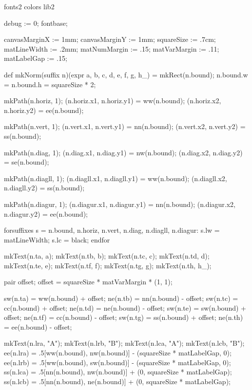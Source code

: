 \environment fonts2
\environment colors
\environment lib2


\startMPinitializations

debug := 0;
fontbase;

canvasMarginX := 1mm;
canvasMarginY := 1mm;
squareSize := .7cm;
matLineWidth := .2mm;
matNumMargin := .15;
matVarMargin := .11;
matLabelGap := .15;


def mkNorm(suffix n)(expr a, b, c, d, e, f, g, h_) =
  mkRect(n.bound);
  n.bound.w = n.bound.h = squareSize * 2;

  mkPath(n.horiz, 1);
  (n.horiz.x1, n.horiz.y1) = ww(n.bound);
  (n.horiz.x2, n.horiz.y2) = ee(n.bound);

  mkPath(n.vert, 1);
  (n.vert.x1, n.vert.y1) = nn(n.bound);
  (n.vert.x2, n.vert.y2) = ss(n.bound);

  mkPath(n.diag, 1);
  (n.diag.x1, n.diag.y1) = nw(n.bound);
  (n.diag.x2, n.diag.y2) = se(n.bound);

  mkPath(n.diagll, 1);
  (n.diagll.x1, n.diagll.y1) = ww(n.bound);
  (n.diagll.x2, n.diagll.y2) = ss(n.bound);

  mkPath(n.diagur, 1);
  (n.diagur.x1, n.diagur.y1) = nn(n.bound);
  (n.diagur.x2, n.diagur.y2) = ee(n.bound);

  forsuffixes s = n.bound, n.horiz, n.vert, n.diag, n.diagll, n.diagur:
    s.lw = matLineWidth;
    s.lc = black;
  endfor

  mkText(n.ta, a);
  mkText(n.tb, b);
  mkText(n.tc, c);
  mkText(n.td, d);
  mkText(n.te, e);
  mkText(n.tf, f);
  mkText(n.tg, g);
  mkText(n.th, h_);

  pair offset;
  offset = squareSize * matVarMargin * (1, 1);

  sw(n.ta) = ww(n.bound) + offset;
  ne(n.tb) = nn(n.bound) - offset;
  sw(n.tc) = cc(n.bound) + offset;
  ne(n.td) = ne(n.bound) - offset;
  sw(n.te) = sw(n.bound) + offset;
  ne(n.tf) = cc(n.bound) - offset;
  sw(n.tg) = ss(n.bound) + offset;
  ne(n.th) = ee(n.bound) - offset;

  mkText(n.lra, "A");
  mkText(n.lrb, "B");
  mkText(n.lca, "A");
  mkText(n.lcb, "B");
  ee(n.lra) = .5[ww(n.bound), nw(n.bound)] - (squareSize * matLabelGap, 0);
  ee(n.lrb) = .5[ww(n.bound), sw(n.bound)] - (squareSize * matLabelGap, 0);
  ss(n.lca) = .5[nn(n.bound), nw(n.bound)] + (0, squareSize * matLabelGap);
  ss(n.lcb) = .5[nn(n.bound), ne(n.bound)] + (0, squareSize * matLabelGap);

